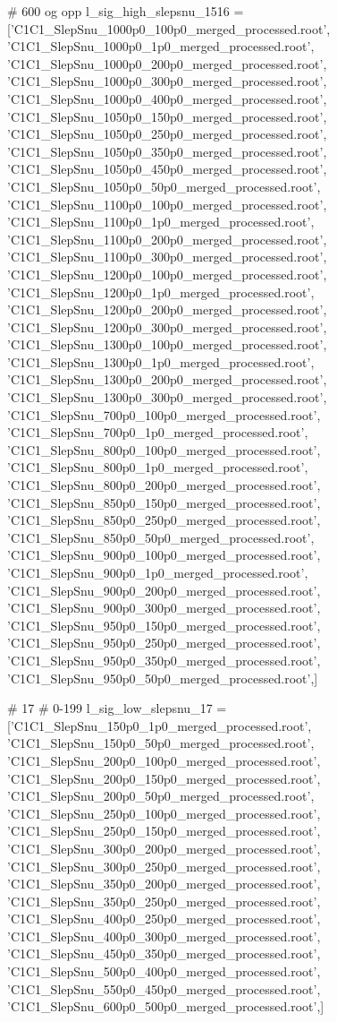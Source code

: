 # 600 og opp
l_sig_high_slepsnu_1516 = ['C1C1_SlepSnu_1000p0_100p0_merged_processed.root',
'C1C1_SlepSnu_1000p0_1p0_merged_processed.root',
'C1C1_SlepSnu_1000p0_200p0_merged_processed.root',
'C1C1_SlepSnu_1000p0_300p0_merged_processed.root',
'C1C1_SlepSnu_1000p0_400p0_merged_processed.root',
'C1C1_SlepSnu_1050p0_150p0_merged_processed.root',
'C1C1_SlepSnu_1050p0_250p0_merged_processed.root',
'C1C1_SlepSnu_1050p0_350p0_merged_processed.root',
'C1C1_SlepSnu_1050p0_450p0_merged_processed.root',
'C1C1_SlepSnu_1050p0_50p0_merged_processed.root',
'C1C1_SlepSnu_1100p0_100p0_merged_processed.root',
'C1C1_SlepSnu_1100p0_1p0_merged_processed.root',
'C1C1_SlepSnu_1100p0_200p0_merged_processed.root',
'C1C1_SlepSnu_1100p0_300p0_merged_processed.root',
'C1C1_SlepSnu_1200p0_100p0_merged_processed.root',
'C1C1_SlepSnu_1200p0_1p0_merged_processed.root',
'C1C1_SlepSnu_1200p0_200p0_merged_processed.root',
'C1C1_SlepSnu_1200p0_300p0_merged_processed.root',
'C1C1_SlepSnu_1300p0_100p0_merged_processed.root',
'C1C1_SlepSnu_1300p0_1p0_merged_processed.root',
'C1C1_SlepSnu_1300p0_200p0_merged_processed.root',
'C1C1_SlepSnu_1300p0_300p0_merged_processed.root',
'C1C1_SlepSnu_700p0_100p0_merged_processed.root',
'C1C1_SlepSnu_700p0_1p0_merged_processed.root',
'C1C1_SlepSnu_800p0_100p0_merged_processed.root',
'C1C1_SlepSnu_800p0_1p0_merged_processed.root',
'C1C1_SlepSnu_800p0_200p0_merged_processed.root',
'C1C1_SlepSnu_850p0_150p0_merged_processed.root',
'C1C1_SlepSnu_850p0_250p0_merged_processed.root',
'C1C1_SlepSnu_850p0_50p0_merged_processed.root',
'C1C1_SlepSnu_900p0_100p0_merged_processed.root',
'C1C1_SlepSnu_900p0_1p0_merged_processed.root',
'C1C1_SlepSnu_900p0_200p0_merged_processed.root',
'C1C1_SlepSnu_900p0_300p0_merged_processed.root',
'C1C1_SlepSnu_950p0_150p0_merged_processed.root',
'C1C1_SlepSnu_950p0_250p0_merged_processed.root',
'C1C1_SlepSnu_950p0_350p0_merged_processed.root',
'C1C1_SlepSnu_950p0_50p0_merged_processed.root',]


# 17
# 0-199
l_sig_low_slepsnu_17 = ['C1C1_SlepSnu_150p0_1p0_merged_processed.root',
'C1C1_SlepSnu_150p0_50p0_merged_processed.root',
'C1C1_SlepSnu_200p0_100p0_merged_processed.root',
'C1C1_SlepSnu_200p0_150p0_merged_processed.root',
'C1C1_SlepSnu_200p0_50p0_merged_processed.root',
'C1C1_SlepSnu_250p0_100p0_merged_processed.root',
'C1C1_SlepSnu_250p0_150p0_merged_processed.root',
'C1C1_SlepSnu_300p0_200p0_merged_processed.root',
'C1C1_SlepSnu_300p0_250p0_merged_processed.root',
'C1C1_SlepSnu_350p0_200p0_merged_processed.root',
'C1C1_SlepSnu_350p0_250p0_merged_processed.root',
'C1C1_SlepSnu_400p0_250p0_merged_processed.root',
'C1C1_SlepSnu_400p0_300p0_merged_processed.root',
'C1C1_SlepSnu_450p0_350p0_merged_processed.root',
'C1C1_SlepSnu_500p0_400p0_merged_processed.root',
'C1C1_SlepSnu_550p0_450p0_merged_processed.root',
'C1C1_SlepSnu_600p0_500p0_merged_processed.root',]

